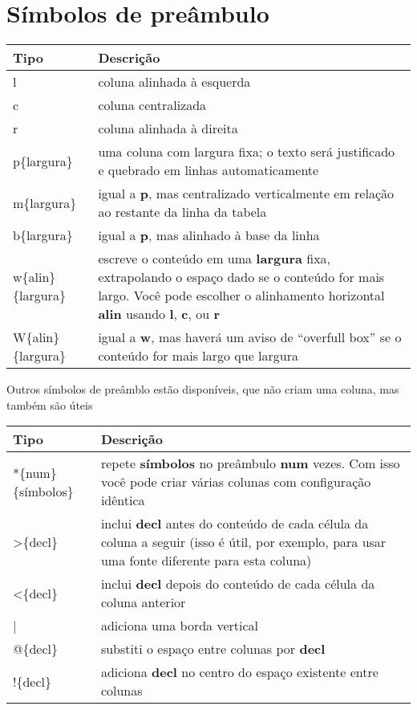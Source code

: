 \documentclass[brazilian]{article}
\begin{document}
\vspace{10pt}

\section{Símbolos de preâmbulo}

\begin{tabular}{lp{9cm}}
    \toprule
    Tipo & Descrição \\
    \midrule
    l    & coluna alinhada à esquerda \\
    \addlinespace
    c    & coluna centralizada\\
    \addlinespace
    r    & coluna alinhada à direita\\
    \addlinespace
    p\{largura\}    & uma coluna com largura fixa; o texto será justificado e quebrado em linhas automaticamente\\
    \addlinespace
    m\{largura\}    & igual a \textbf{p}, mas centralizado verticalmente em relação ao restante da linha da tabela\\
    \addlinespace
    b\{largura\}    & igual a \textbf{p}, mas alinhado à base da linha\\
    \addlinespace 
    w\{alin\}\{largura\}    & escreve o conteúdo em uma \textbf{largura} fixa, extrapolando o espaço dado se o conteúdo for mais largo. Você pode escolher o alinhamento horizontal \textbf{alin} usando \textbf{l}, \textbf{c}, ou \textbf{r}\\
    \addlinespace
    W\{alin\}\{largura\}    & igual a \textbf{w}, mas haverá um aviso de “overfull box” se o conteúdo for mais largo que largura\\
    \bottomrule
\end{tabular}

\vspace{10pt}

Outros símbolos de preâmblo estão disponíveis, que não criam uma coluna, mas também são úteis \\

\begin{tabular}{lp{9cm}}
    \toprule
    Tipo & Descrição \\
    \midrule
    *\{num\}\{símbolos\}    & repete \textbf{símbolos} no preâmbulo \textbf{num} vezes. Com isso você pode criar várias colunas com configuração idêntica\\
    \addlinespace
    >\{decl\}    & inclui \textbf{decl} antes do conteúdo de cada célula da coluna a seguir (isso é útil, por exemplo, para usar uma fonte diferente para esta coluna)\\
    \addlinespace
    <\{decl\}    & inclui \textbf{decl} depois do conteúdo de cada célula da coluna anterior\\
    \addlinespace
    |    & adiciona uma borda vertical\\
    \addlinespace
    @\{decl\}    & substiti o espaço entre colunas por \textbf{decl}\\
    \addlinespace
    !\{decl\}    & adiciona \textbf{decl} no centro do espaço existente entre colunas\\
    \bottomrule
\end{tabular}
\end{document}
